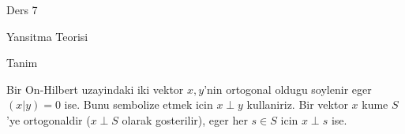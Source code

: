 \documentclass[12pt,fleqn]{article}\usepackage{../common}
\begin{document}
Ders 7

Yansitma Teorisi 

Tanim 

Bir On-Hilbert uzayindaki iki vektor $x,y$'nin ortogonal oldugu soylenir
eger $(x|y) = 0$ ise. Bunu sembolize etmek icin $x \perp y$ kullaniriz. Bir
vektor $x$ kume $S$'ye ortogonaldir ($x \perp S$ olarak gosterilir), eger
her $s \in S$ icin $x \perp s$ ise. 
\end{document}

